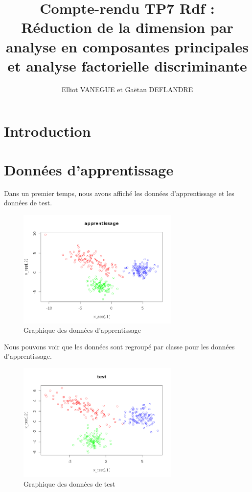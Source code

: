 \documentclass[a4paper,11pt]{article}
\title{Compte-rendu TP7 Rdf : Réduction de la dimension par analyse en composantes principales et analyse factorielle discriminante}
\author{Elliot VANEGUE et Gaëtan DEFLANDRE}
\begin{document}


  \maketitle
  
  \mbox{}
  \newpage
  \clearpage
  
  \section*{Introduction}
 
  \section{Données d'apprentissage}
  Dans un premier temps, nous avons affiché les données d'apprentissage et les données de test.
  
  \begin{figure}[H]
    \center
   \includegraphics[width=8cm]{donnees_apprentissage.png}
   \caption{Graphique des données d'apprentissage}
  \end{figure}
  
  Nous pouvons voir que les données sont regroupé par classe pour les données d'apprentissage.
  
  \begin{figure}[H]
  \center
   \includegraphics[width=8cm]{donnees_test.png}
   \caption{Graphique des données de test}
  \end{figure}
  
\end{document}
